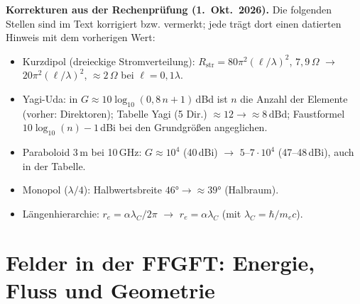 
\begin{tcolorbox}[colback=red!3!white,colframe=red!50!black,boxrule=0.8pt,title={Korrekturhinweise},fonttitle=\bfseries]
\textbf{Korrekturen aus der Rechenprüfung (1.~Okt.~2026).} Die folgenden Stellen sind im Text korrigiert bzw. vermerkt; jede trägt dort einen datierten Hinweis mit dem vorherigen Wert:
\begin{itemize}
\item Kurzdipol (dreieckige Stromverteilung): $R_\mathrm{str}=80\pi^2(\ell/\lambda)^2$, $7{,}9\,\Omega$ $\to$ $20\pi^2(\ell/\lambda)^2$, $\approx2\,\Omega$ bei $\ell=0{,}1\lambda$.
\item Yagi-Uda: in $G\approx10\log_{10}(0{,}8\,n+1)$\,dBd ist $n$ die Anzahl der Elemente (vorher: Direktoren); Tabelle Yagi (5 Dir.) $\approx12\to\approx8\,\mathrm{dBd}$; Faustformel $10\log_{10}(n)-1$\,dBi bei den Grundgrößen angeglichen.
\item Paraboloid 3\,m bei 10\,GHz: $G\approx10^4$ (40\,dBi) $\to$ $5$--$7\cdot10^4$ (47--48\,dBi), auch in der Tabelle.
\item Monopol ($\lambda/4$): Halbwertsbreite $46°\to\approx39°$ (Halbraum).
\item Längenhierarchie: $r_e=\alpha\lambda_C/2\pi$ $\to$ $r_e=\alpha\lambda_C$ (mit $\lambda_C=\hbar/m_ec$).
\end{itemize}
\end{tcolorbox}

\providecommand{\BM}{\textbf{[B]}}
\providecommand{\KM}{\textbf{[K]}}
\providecommand{\SM}{\textbf{[S]}}
\providecommand{\SetzM}{\textbf{[SETZUNG]}}
\providecommand{\QM}{\textbf{[Q]}}
\providecommand{\EM}{\textbf{[E]}}
\providecommand{\XM}{\textbf{[X]}}

\chapter*{Felder in der FFGFT: Energie, Fluss und Geometrie}

